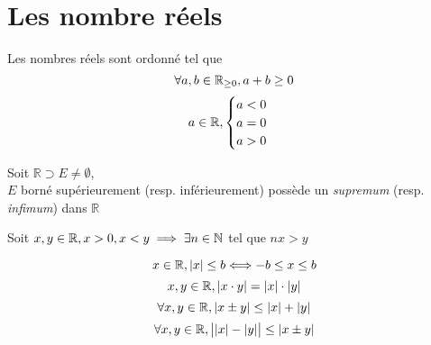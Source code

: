 \section{Les nombre réels}
	\begin{mythm}
		Les nombres réels sont ordonné tel que 
		\[\forall a,b \in\mathbb{R}_{\geq 0}, a+b \geq 0\]
		\[a \in\mathbb{R}, \begin{cases}
		a<0\\
		a=0\\
		a>0
		\end{cases}\]
	\end{mythm}
	\begin{mythm}
		Soit $\mathbb{R}\supset E\neq\emptyset$,\\
		$E$ borné supérieurement (resp. inférieurement) possède un \textit{supremum} (resp. \textit{infimum}) dans $\mathbb{R}$
	\end{mythm}
	\begin{myprop}
		Soit $x,y\in\mathbb{R}, x>0, x<y \implies \exists n\in\mathbb{N}$ tel que $nx>y$
	\end{myprop}
	\begin{mydef}
		\[x\in\mathbb{R},|x|\leq b\Longleftrightarrow -b\leq x\leq b\]
		\[x,y\in\mathbb{R}, |x\cdot y|= |x|\cdot |y|\]
		\[\forall x,y\in\mathbb{R},|x\pm y|\leq |x|+|y|\]
		\[\forall x,y\in\mathbb{R}, \big||x|-|y|\big|\leq |x\pm y|\]
	\end{mydef}